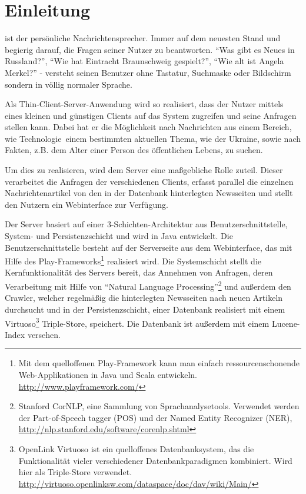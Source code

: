 
\chapter{Einleitung}

\NewsGenie ist der persönliche Nachrichtensprecher. Immer auf dem neuesten
Stand und begierig darauf, die Fragen seiner Nutzer zu beantworten.
"`Was gibt es Neues in Russland?"', "`Wie hat Eintracht
Braunschweig gespielt?"', "`Wie alt ist Angela Merkel?"' - \NewsGenie
versteht seinen Benutzer ohne Tastatur, Suchmaske oder Bildschirm sondern in
völlig normaler Sprache.

Als Thin-Client-Server-Anwendung wird \NewsGenie so realisiert, dass der
Nutzer mittels eines kleinen und günstigen Clients auf das System
zugreifen und seine Anfragen stellen kann. Dabei hat er die Möglichkeit nach
Nachrichten aus einem Bereich, wie \glqq Technologie\grqq\, einem bestimmten aktuellen Thema, wie der Ukraine, sowie nach Fakten,
z.B. dem Alter einer Person des öffentlichen Lebens, zu suchen.

Um dies zu realisieren, wird dem Server eine maßgebliche Rolle zuteil. Dieser verarbeitet die Anfragen der verschiedenen Clients, 
erfasst parallel die einzelnen Nachrichtenartikel von den in der Datenbank
hinterlegten Newsseiten und stellt den Nutzern ein Webinterface zur Verfügung.

Der Server basiert auf einer 3-Schichten-Architektur aus
Benutzerschnittstelle, System- und Persistenzschicht und wird in Java
entwickelt.
Die Benutzerschnittstelle besteht auf der Serverseite aus dem Webinterface, das mit Hilfe des Play-Frameworks\footnote{Mit dem quelloffenen Play-Framework kann man einfach ressourcenschonende Web-Applikationen in Java und Scala entwickeln. \url{http://www.playframework.com/}} realisiert wird.
Die Systemschicht stellt die Kernfunktionalität des Servers bereit, das Annehmen von Anfragen, deren Verarbeitung mit Hilfe von "`Natural Language Processing"'\footnote{Stanford CorNLP, eine Sammlung von Sprachanalysetools. Verwendet werden der Part-of-Speech tagger (POS) und der Named Entity Recognizer (NER), \url{http://nlp.stanford.edu/software/corenlp.shtml}} und außerdem den Crawler, welcher regelmäßig die hinterlegten Newsseiten nach neuen Artikeln durchsucht und in der Persistenzschicht, einer Datenbank realisiert mit einem Virtuoso\footnote{OpenLink Virtuoso ist ein quelloffenes Datenbanksystem, das die Funktionalität vieler verschiedener Datenbankparadigmen kombiniert. Wird hier als Triple-Store verwendet. \url{http://virtuoso.openlinksw.com/dataspace/doc/dav/wiki/Main/}} Triple-Store, speichert. 
Die Datenbank ist außerdem mit einem Lucene-Index versehen.

